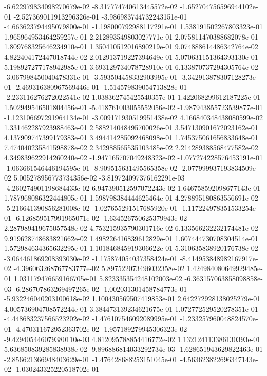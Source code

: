 -6.622979834098270679e-02
-8.317774740613445572e-02
-1.652704756596944102e-01
-2.527369011913296326e-01
-3.986983744732243151e-01
-4.663623794495079800e-01
-1.198000792988117291e-01
1.538191502267803323e-01
1.965964953464259257e-01
2.212893549803027771e-01
2.075811470388682078e-01
1.809768325646234910e-01
1.350410512016890219e-01
9.074888614486342764e-02
4.822404172447018744e-02
2.012913719227394649e-01
5.070631151364393130e-01
5.198927277178942985e-01
3.693129734078728910e-01
6.133870737294305764e-02
-3.067998450040478331e-01
-3.593504458332903995e-01
-3.342913878307128273e-01
-2.469316380967569446e-01
-1.514579839054713828e-01
-2.233116276272022541e-02
1.038362745425540357e-01
1.422068299612187225e-01
1.502949546501804456e-01
-5.418761003055552056e-02
-1.987943855723539877e-01
-1.123106697291964134e-01
-3.009171930519951438e-02
4.166840348438080599e-02
1.331462287923988463e-01
2.588214048495700026e-01
3.547130901672023162e-01
4.137909747399179383e-01
3.494414285092468098e-01
1.745375061656833648e-01
7.474040235841598878e-02
2.342988565535103485e-02
2.214289388568477582e-02
4.349839622914260240e-02
-1.947165707049248323e-02
-1.077274228576453191e-01
-1.063661546446194595e-01
-8.909515631495565358e-02
-2.077999937193834509e-02
5.005278956773734356e-02
-3.819724097376162291e-03
-4.260274901198684433e-02
6.947390512597072243e-02
1.646758592098677143e-01
1.787968086322444805e-01
1.598798384444625464e-01
4.278895180863556691e-02
-5.216641390856281008e-02
-1.027655291517685920e-01
-1.117224978351533254e-01
-6.126859517991965071e-02
-1.634526750625379943e-02
2.287989419675057548e-02
4.753215935790301716e-02
6.133566232232174481e-02
9.919628748683821662e-02
1.498226416839612829e-01
1.607444730708304514e-01
1.572984634365632295e-01
1.101846845919306622e-01
5.310635838920176738e-02
-3.064461869208393030e-02
-1.175874054037358424e-01
-8.414953848982167917e-02
-4.396063268767783777e-02
5.897522073496032358e-02
1.424984080649929485e-01
1.031179476659166705e-01
5.823335354248102003e-02
-6.363157063858098858e-03
-6.286707863269497265e-02
-1.002031301458784773e-01
-5.932246040203100618e-02
1.100430569507419853e-01
2.642272928138025279e-01
4.005736904708572244e-01
3.384473139234621675e-01
1.072772529520278351e-01
-4.448683237566523202e-02
-1.476107546092089995e-01
-1.233257960048824570e-01
-4.470311672952363702e-02
-1.957189279945306323e-02
-9.429405446079380110e-03
4.812095788854416772e-02
1.132124113386130393e-01
5.636850839285838938e-02
-9.896886814033292734e-03
-1.628651943629822463e-01
-2.856621366948403629e-01
-1.476428688253151045e-01
-4.563623822696347143e-02
-1.030243325220518702e-01

